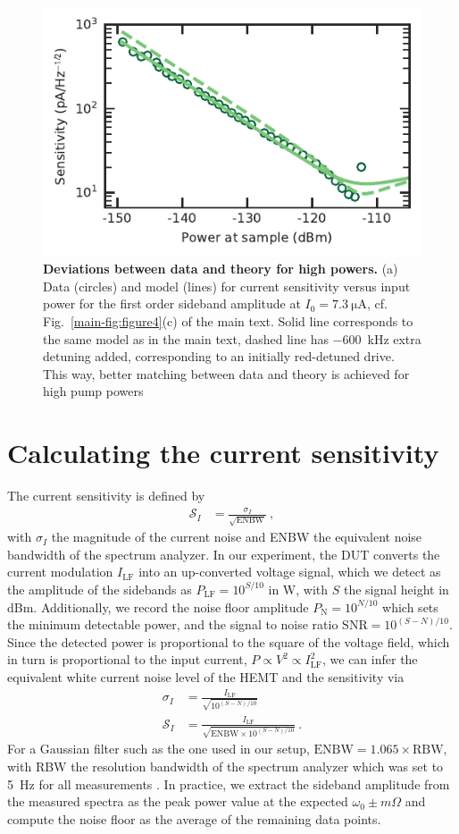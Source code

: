 \begin{figure}
	\centering
	\includegraphics[width=.5\linewidth]{chapter-currentdetection/figures/SM_Pin_detuning}
	\caption{
		\textbf{Deviations between data and theory for high powers.}
		(a) Data (circles) and model (lines) for current sensitivity versus input power for the first order sideband amplitude at $I_0=\SI{7.3}{\micro\ampere}$, cf. Fig.~\ref{main-fig:figure4}(c) of the main text.
		Solid line corresponds to the same model as in the main text, dashed line has \SI{-600}{\kilo\hertz} extra detuning added, corresponding to an initially red-detuned drive.
		This way, better matching between data and theory is achieved for high pump powers
	}
	\label{fig:deviation_power}
\end{figure}


\section{Calculating the current sensitivity}\label{sec:analysis}

% 
The current sensitivity is defined by
% 
\begin{align}
\mathcal{S}_I & = \frac{\sigma_I}{\sqrt{\text{ENBW}}}\ ,
\end{align}
% 
with $\sigma_I$ the magnitude of the current noise and ENBW the equivalent noise bandwidth of the spectrum analyzer.
% 
In our experiment, the DUT converts the current modulation $I_\text{LF}$ into an up-converted voltage signal, which we detect as the amplitude of the sidebands as $P_\text{LF}=10^{S/10}$ in \si{\watt}, with $S$ the signal height in \si{dBm}.
% 
Additionally, we record the noise floor amplitude $P_\text{N}=10^{N/10}$ which sets the minimum detectable power, and the signal to noise ratio $\text{SNR}=10^{(S-N)/10}$.
% 
Since the detected power is proportional to the square of the voltage field, which in turn is proportional to the input current, $P \propto V^2 \propto I_\text{LF}^2$, we can infer the equivalent white current noise level of the HEMT and the sensitivity via
% 
\begin{align}
\sigma_I &= \frac{I_\text{LF}}{\sqrt{10^{(S-N)/10}}} \\
\mathcal{S}_I &= \frac{I_\text{LF}}{\sqrt{\text{ENBW}\times10^{(S-N)/10}}}\ .
\end{align}
% 
For a Gaussian filter such as the one used in our setup, $\text{ENBW}=1.065 \times \text{RBW}$, with RBW the resolution bandwidth of the spectrum analyzer which was set to \SI{5}{\hertz} for all measurements \cite{rauscherFundamentalsSpectrumAnalysis2016}.
% 
In practice, we extract the sideband amplitude from the measured spectra as the peak power value at the expected $\omega_0 \pm m\Omega$ and compute the noise floor as the average of the remaining data points.

